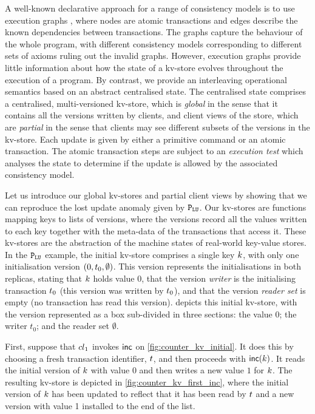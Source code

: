 

A well-known declarative approach for a range of consistency models
is to use execution graphs \cite{adya-icde,adya,framework-concur,ev_transactions},
where nodes are atomic transactions and edges describe the
known dependencies between transactions. The graphs capture the
behaviour of the whole program, with different consistency models
corresponding to different sets of axioms ruling out the invalid graphs. 
However, execution graphs provide little information about how the 
state of a kv-store evolves throughout the execution of a program.
By contrast, we provide an interleaving operational semantics based on an
abstract centralised state. The centralised state comprises a
centralised, multi-versioned kv-store, which is {\em global} in the
sense that it contains all the versions written by clients, and client views of the store,
which are {\em partial} in the sense that clients may see different 
subsets of the versions in the kv-store. Each update is given by either
a primitive command or an atomic transaction. The atomic
transaction steps are subject to an {\em execution test} which
analyses the state to determine if the update is allowed by 
the associated consistency model. 



Let us introduce our global kv-stores and partial client views by
showing that we can reproduce the lost update anomaly given by 
\(\mathtt{P}_{\mathtt{LU}}\).
Our kv-stores are functions mapping keys to lists of versions, where
the versions  record all the values written to each key together with the
meta-data of the transactions that access it. 
These kv-stores are the abstraction of the machine states of real-world key-value stores.
In the \(\mathtt{P}_{\mathtt{LU}}\) example, the initial kv-store comprises a single key \(k\), with only one initialisation version \((0, t_{0}, \emptyset)\).
This version represents the initialisations in both replicas,
stating that \(k\) holds value \(0\), 
that the version \emph{writer} is the initialising transaction
\(t_0\) (this version was written by \(t_0\)), 
and that the version \emph{reader set} is empty (no transaction has read this version). 
 depicts this initial kv-store, with the version
represented as a box sub-divided in three sections: the value \(0\);
the writer \(t_0\); and the reader set \(\emptyset\). 


First, suppose that \({cl}_1\) invokes \(\mathsf{inc}\) on \cref{fig:counter_kv_initial}. 
It does this by choosing a fresh transaction identifier, \(t\), 
and then proceeds with \(\mathsf{inc}(k)\). It reads the initial version
of \(k\) with value \(0\) 
and then writes a new value \(1\) for \(k\). 
The resulting kv-store is depicted in \cref{fig:counter_kv_first_inc},
where  the initial version of \(k\)  has been  updated to reflect that it
has been read by \(t\) and a new version with value 1 installed to the end of the list.

